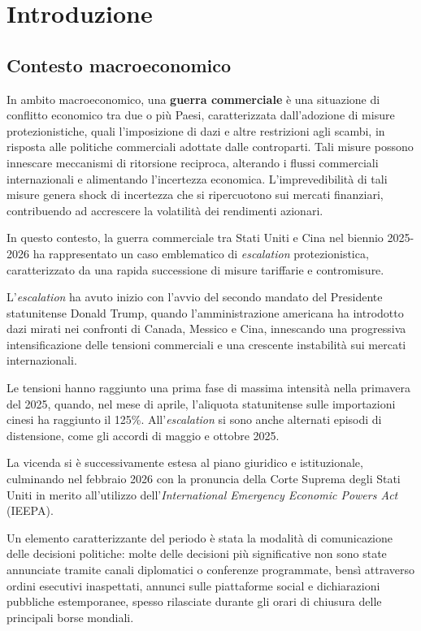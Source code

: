 \chapter{Introduzione}
\label{cap:introduzione}

\section{Contesto macroeconomico}
In ambito macroeconomico, una \textbf{guerra commerciale} è una situazione di conflitto economico tra due o più Paesi, caratterizzata dall'adozione di misure protezionistiche, 
quali l'imposizione di dazi e altre restrizioni agli scambi, in risposta alle politiche commerciali adottate dalle controparti. Tali misure possono innescare meccanismi 
di ritorsione reciproca, alterando i flussi commerciali internazionali e alimentando l'incertezza economica. 
L'imprevedibilità di tali misure genera shock di incertezza che si ripercuotono sui mercati finanziari, contribuendo ad accrescere la volatilità dei rendimenti azionari.

In questo contesto, la guerra commerciale tra Stati Uniti e Cina nel biennio 2025-2026 ha rappresentato un caso emblematico di \emph{escalation} protezionistica, caratterizzato 
da una rapida successione di misure tariffarie e contromisure.

L'\emph{escalation} ha avuto inizio con l'avvio del secondo mandato del Presidente statunitense Donald Trump, quando l'amministrazione americana ha introdotto dazi mirati 
nei confronti di Canada, Messico e Cina, innescando una progressiva intensificazione delle tensioni commerciali e una crescente instabilità sui mercati internazionali.

Le tensioni hanno raggiunto una prima fase di massima intensità nella primavera del 2025, quando, nel mese di aprile, l'aliquota statunitense sulle importazioni cinesi ha 
raggiunto il 125\%. All'\emph{escalation} si sono anche alternati episodi di distensione, come gli accordi di maggio e ottobre 2025.

La vicenda si è successivamente estesa al piano giuridico e istituzionale, culminando nel febbraio 2026 con la pronuncia della Corte Suprema degli Stati Uniti in merito 
all'utilizzo dell'\emph{International Emergency Economic Powers Act} (IEEPA).

Un elemento caratterizzante del periodo è stata la modalità di comunicazione delle decisioni politiche: molte delle decisioni più significative non sono state annunciate 
tramite canali diplomatici o conferenze programmate, bensì attraverso ordini esecutivi inaspettati, annunci sulle piattaforme social e dichiarazioni pubbliche estemporanee, 
spesso rilasciate durante gli orari di chiusura delle principali borse mondiali.

